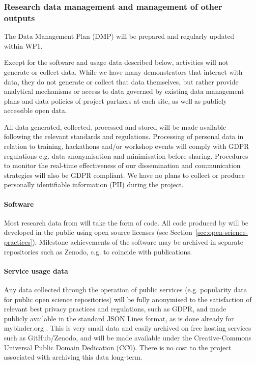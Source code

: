 
\subsubsection{Research data management and management of other outputs}

The Data Management Plan (DMP) will be prepared and regularly updated within WP1.

Except for the software and usage data described below,
\TheProject activities will not generate or collect data.
While we have many demonstrators that interact with data, they do not generate or collect that
data themselves, but rather provide analytical mechanisms or access to data governed by
existing data management plans and data policies of project partners at each site,
as well as publicly accessible open data.

All data generated, collected, processed and stored will be made available following the
relevant standards and regulations. Processing of personal data in relation to training,
hackathons and/or workshop events will comply with GDPR regulations e.g. data
anonymisation and minimisation before sharing.
Procedures to monitor the real-time effectiveness of our dissemination and
communication strategies will also be GDPR compliant.
We have no plans to collect or produce personally identifiable information (PII)
during the project.\medskip

\paragraph*{Software}
Most research data from \TheProject will take the form of code.
All code produced by \TheProject will be developed in the public using open
source licenses (see Section~\ref{sec:open-science-practices}).
Milestone achievements of the software may be archived
in separate repositories such as Zenodo,
e.g. to coincide with publications.

\paragraph*{Service usage data}
Any data collected through the operation of public services
(e.g. popularity data for public open science repositories)
will be fully anonymised to the satisfaction of relevant best privacy practices and regulations, such as GDPR,
and made publicly available in the standard JSON Lines format,
as is done already for mybinder.org \cite{mybinder-archive}.
This is very small data and easily archived on free hosting services such as GitHub/Zenodo,
and will be made available under the Creative-Commons Universal Public Domain Dedication (CC0).
There is no cost to the project associated with archiving this data long-term.


